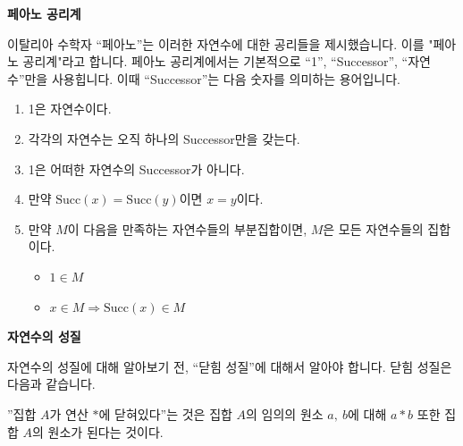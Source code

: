 \newpage

\begin{flushleft}
    {\textcolor{subheader}{{\LARGE\textbf{페아노 공리계}}}}
\end{flushleft}
\begin{flushleft}
    이탈리아 수학자 “페아노”는 이러한 자연수에 대한 공리들을 제시했습니다. 이를 "페아노 공리계"라고 합니다. 페아노 공리계에서는 기본적으로 “1”, “Successor”, “자연수”만을 사용힙니다. 이때 “Successor”는 다음 숫자를 의미하는 용어입니다.
\end{flushleft}

\begin{tcolorbox}[colback = white, colframe = Axiom, title = \textmd{공리: 페아노 공리계}]
    \begin{enumerate}
        \item 1은 자연수이다.
        \item 각각의 자연수는 오직 하나의 Successor만을 갖는다.
        \item 1은 어떠한 자연수의 Successor가 아니다.
        \item 만약 $\text{Succ}(x) = \text{Succ}(y)$이면 $x = y$이다.
        \item 만약 $M$이 다음을 만족하는 자연수들의 부분집합이면, $M$은 모든 자연수들의 집합이다.
        \begin{itemize}
            \item $1 \in M$
            \item $x \in M \Rightarrow \text{Succ}(x) \in M$
        \end{itemize}
    \end{enumerate}
\end{tcolorbox}
\bigskip
\begin{flushleft}
    {\textcolor{subheader}{{\LARGE\textbf{자연수의 성질}}}}
\end{flushleft}

\begin{flushleft}
    자연수의 성질에 대해 알아보기 전, “닫힘 성질”에 대해서 알아야 합니다. 닫힘 성질은 다음과 같습니다.
\end{flushleft}

\begin{tcolorbox}[colback = white, colframe = Theorem, title = \textmd{정리: 닫힘 성질}]
    ”집합 $A$가 연산 $*$에 닫혀있다”는 것은 집합 $A$의 임의의 원소 $a, \ b$에 대해 $a * b$ 또한 집합 $A$의 원소가 된다는 것이다.
\end{tcolorbox}

